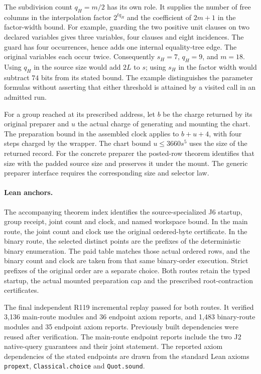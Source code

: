 \documentclass[11pt,a4paper]{article}
\begin{document}
The subdivision count \(q_H=m/2\) has its own role. It supplies the number
of free columns in the interpolation factor \(2^{tq_H}\) and the
coefficient of \(2m+1\) in the factor-width bound. For example, guarding
the two positive unit clauses on two declared variables gives three
variables, four clauses and eight incidences. The guard has four
occurrences, hence adds one internal equality-tree edge. The original
variables each occur twice. Consequently \(s_H=7\), \(q_H=9\), and
\(m=18\). Using \(q_H\) in the source size would add \(2L\) to \(s\);
using \(s_H\) in the factor width would subtract \(74\) bits from its
stated bound. The example distinguishes the parameter formulas without
asserting that either threshold is attained by a visited call in an
admitted run.

For a group reached at its prescribed address, let \(b\) be the charge
returned by its original preparer and \(u\) the actual charge of
generating and mounting the chart. The preparation bound in the
assembled clock applies to \(b+u+4\), with four steps charged by the
wrapper. The chart bound \(u\le 3660s^5\) uses the size of the returned
record. For the concrete preparer the posted-row theorem identifies
that size with the padded source size and preserves it under the mount.
The generic preparer interface requires the corresponding size and selector law.

\paragraph*{Lean anchors.}
The accompanying theorem index identifies the source-specialized J6
startup, group receipt, joint count and clock, and named workspace
bound. In the main route, the joint count and clock use the original
ordered-byte certificate. In the binary route, the selected distinct
points are the prefixes of the deterministic binary enumeration. The
paid table matches those actual ordered rows, and the binary count and
clock are taken from that same binary-order execution. Strict prefixes
of the original order are a separate choice. Both routes retain the
typed startup, the actual mounted preparation cap and the prescribed
root-contraction certificates.

The final independent R119 incremental replay passed for both routes.
It verified 3,136 main-route modules and 36 endpoint axiom reports,
and 1,483 binary-route modules and 35 endpoint axiom reports. Previously
built dependencies were reused after verification. The main-route
endpoint reports include the two J2 native-query guarantees and their
joint statement. The reported axiom dependencies of the stated
endpoints are drawn from the standard Lean axioms
\texttt{propext}, \texttt{Classical.choice} and \texttt{Quot.sound}.
\end{document}
